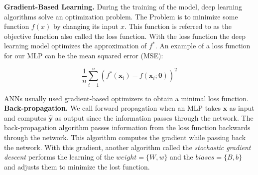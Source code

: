 

\textbf{Gradient-Based Learning.} During the training of the model, deep
learning algorithms solve an optimization problem. The Problem is to minimize
some function $f(x)$ by changing its input $x$. This function is referred to as
the objective function also called the loss function. With the loss function the
deep learning model optimizes the approximation of $f^{*}$. An example of a loss
function for our MLP can be the mean squared error (MSE):

\begin{equation} 
  \frac{1}{n}\sum_{i=1}^n(f^*(\bm x_i)-f(\bm x_i;\bm{\theta}))^2
\end{equation}

ANNs usually used gradient-based optimizers to obtain a minimal loss function.\\

\textbf{Back-propagation.} We call forward propagation when an MLP takes
$\bm{x}$ as input and computes $\bm{\hat{y}}$ as output since the information
passes through the network. The back-propagation algorithm passes information
from the loss function backwards through the network. This algorithm computes
the gradient while passing back the network. With this gradient, another
algorithm called the \textit{stochastic gradient descent} performs the learning
of the $weight = \{W,w\}$ and the $biases = \{B,b\}$ and adjusts them to
minimize the lost function.

